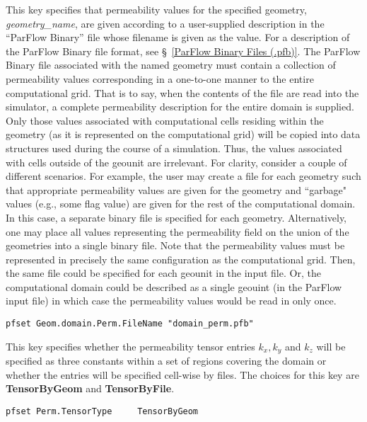 {
This key specifies that permeability values for the specified geometry,
{\em geometry\_name}, are given according to a user-supplied description
in the ``ParFlow Binary'' file whose filename is given as the value.
For a description of the ParFlow Binary file format, see
\S~\ref{ParFlow Binary Files (.pfb)}.  The ParFlow Binary file
associated with the named geometry must contain a collection of
permeability values corresponding in a one-to-one manner to the entire
computational grid.  That is to say, when the contents of the file are
read into the simulator, a complete permeability description for the
entire domain is supplied.  Only those values associated with
computational cells residing within the geometry (as it is represented
on the computational grid) will be copied into data structures used
during the course of a simulation.  Thus, the values associated with
cells outside of the geounit are irrelevant.  For clarity, consider a
couple of different scenarios.  For example, the user may create a file
for each geometry such that appropriate permeability values are given
for the geometry and ``garbage" values (e.g., some flag value) are given
for the rest of the computational domain. In this case, a separate
binary file is specified for each geometry.  Alternatively, one may
place all values representing the permeability field on the union of the
geometries into a single binary file.  Note that the permeability values
must be represented in precisely the same configuration as the
computational grid. Then, the same file could be specified for each
geounit in the input file.  Or, the computational domain could be
described as a single geouint (in the ParFlow input file) in which case
the permeability values would be read in only once.
}
\begin{display}\begin{verbatim}
pfset Geom.domain.Perm.FileName "domain_perm.pfb"
\end{verbatim}\end{display}

{
This key specifies whether the permeability tensor entries $k_x, k_y$ and $k_z$
will be specified as three constants within a set of regions covering the
domain or whether the entries will be specified cell-wise by files.  
The choices
for this key are {\bf TensorByGeom} and {\bf TensorByFile}.  
}
\begin{display}\begin{verbatim}
pfset Perm.TensorType     TensorByGeom
\end{verbatim}\end{display}

